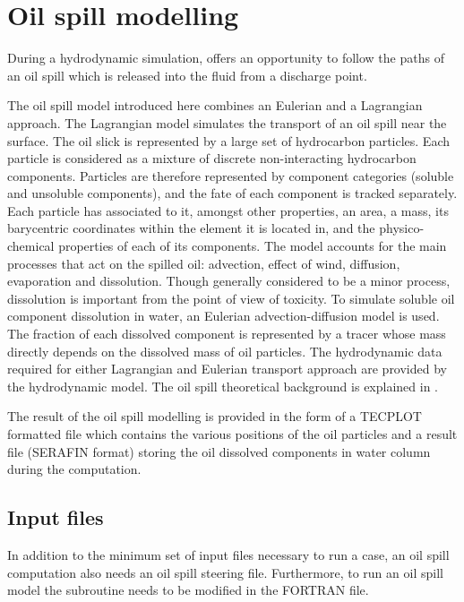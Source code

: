 \chapter{Oil spill modelling}

During a hydrodynamic simulation,  offers an opportunity to follow
the paths of an oil spill which is released into the fluid from a discharge
point.

The oil spill model introduced here combines an Eulerian and a Lagrangian
approach. The Lagrangian model simulates the transport of an oil spill near the
surface. The oil slick is represented by a large set of hydrocarbon particles.
Each particle is considered as a mixture of discrete non-interacting
hydrocarbon components. Particles are therefore represented by component
categories (soluble and unsoluble components), and the fate of each component
is tracked separately. Each particle has associated to it, amongst other
properties, an area, a mass, its barycentric coordinates within the element it
is located in, and the physico-chemical properties of each of its components.
The model accounts for the main processes that act on the spilled oil:
advection, effect of wind, diffusion, evaporation and dissolution. Though
generally considered to be a minor process, dissolution is important from the
point of view of toxicity. To simulate soluble oil component dissolution in
water, an Eulerian advection-diffusion model is used. The fraction of each
dissolved component is represented by a tracer whose mass directly depends on
the dissolved mass of oil particles. The hydrodynamic data required for either
Lagrangian and Eulerian transport approach are provided by the 
hydrodynamic model. The oil spill theoretical background is explained in
\cite{JolyGoeury2013}.

The result of the oil spill modelling is provided in the form of a TECPLOT
formatted file which contains the various positions of the oil particles and a
 result file (SERAFIN format) storing the oil dissolved components in
water column during the computation.


\section{Input files}

In addition to the minimum set of input files necessary to run a 
case, an oil spill computation also needs an oil spill steering file.
Furthermore, to run an oil spill model the subroutine  needs
to be modified in the FORTRAN file.



